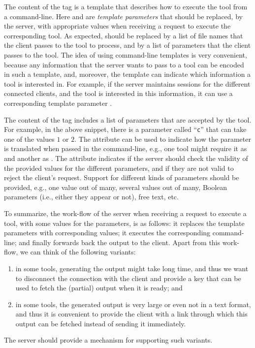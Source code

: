 The content of the  tag is a template that describes
how to execute the tool from a command-line. Here  and
 are \emph{template parameters} that should be
replaced, by the server, with appropriate values when receiving a
request to execute the corresponding tool.
%
As expected,  should be replaced by a list of file
names that the client passes to the tool to process, and
 by a list of parameters that the client passes to
the tool.
%
The idea of using command-line templates is very convenient, because
any information that the server wants to pass to a tool can be encoded
in such a template, and, moreover, the template can indicate which
information a tool is interested in.
%
For example, if the server maintains sessions for the different
connected clients, and the tool is interested in this information, it
can use a corresponding template parameter .


%
The content of the  tag includes a list of parameters
that are accepted by the tool. For example, in the above snippet,
there is a parameter called ``\texttt{c}'' that can take one of the
values $1$ or $2$.  
%
The  attribute can be used to indicate how the parameter
is translated when passed in the command-line, e.g., one tool might
require it as  and another as . The 
attribute indicates if the server should check the validity of the
provided values for the different parameters, and if they are not
valid to reject the client's request.  Support for different kinds of
parameters should be provided, e.g., one value out of many, several
values out of many, Boolean parameters (i.e., either they appear or
not), free text, etc.
%

To summarize, the work-flow of the server when receiving a request to
execute a tool, with some values for the parameters, is as follows: it
replaces the template parameters with corresponding values; it
executes the corresponding command-line; and finally forwards back the
output to the client.
%
Apart from this work-flow, we can think of the following variants:
%
\begin{enumerate}
%
\item in some tools, generating the output might take long time, and
  thus we want to disconnect the connection with the client and
  provide a key that can be used to fetch the (partial) output when it
  is ready; and
%
\item in some tools, the generated output is very large or even not in
  a text format, and thus it is convenient to provide the client with
  a link through which this output can be fetched instead of sending
  it immediately.
\end{enumerate}
%
The server should provide a mechanism for supporting such variants.

